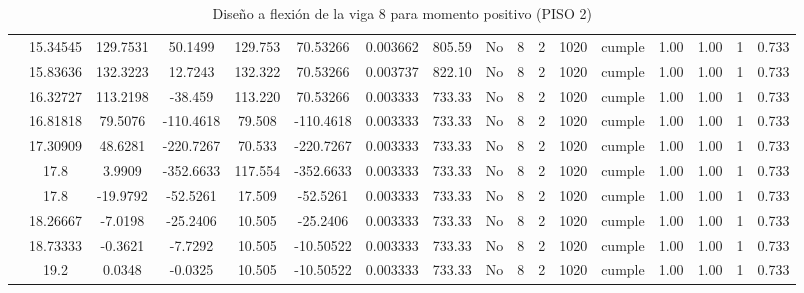 \begin{table}[H]
{\begin{tabular}{|c|c|c|c|c|c|c|c|c|c|c|c|c|c|c|c|c|}
\cline{2-17}        & 15.34545 & 129.7531 & 50.1499 & 129.753 & 70.53266 & 0.003662 & 805.59 & No  & 8   & 2   & 1020 & \cellcolor[rgb]{ .776,  .937,  .808}cumple & 1.00 & 1.00 & 1   & 0.733 \bigstrut\\
\cline{2-17}        & 15.83636 & 132.3223 & 12.7243 & 132.322 & 70.53266 & 0.003737 & 822.10 & No  & 8   & 2   & 1020 & \cellcolor[rgb]{ .776,  .937,  .808}cumple & 1.00 & 1.00 & 1   & 0.733 \bigstrut\\
\cline{2-17}        & 16.32727 & 113.2198 & -38.459 & 113.220 & 70.53266 & 0.003333 & 733.33 & No  & 8   & 2   & 1020 & \cellcolor[rgb]{ .776,  .937,  .808}cumple & 1.00 & 1.00 & 1   & 0.733 \bigstrut\\
\cline{2-17}        & 16.81818 & 79.5076 & -110.4618 & 79.508 & -110.4618 & 0.003333 & 733.33 & No  & 8   & 2   & 1020 & \cellcolor[rgb]{ .776,  .937,  .808}cumple & 1.00 & 1.00 & 1   & 0.733 \bigstrut\\
\cline{2-17}        & 17.30909 & 48.6281 & -220.7267 & 70.533 & -220.7267 & 0.003333 & 733.33 & No  & 8   & 2   & 1020 & \cellcolor[rgb]{ .776,  .937,  .808}cumple & 1.00 & 1.00 & 1   & 0.733 \bigstrut\\
\cline{2-17}        & \cellcolor[rgb]{ .851,  .882,  .949}17.8 & 3.9909 & -352.6633 & 117.554 & -352.6633 & 0.003333 & 733.33 & No  & 8   & 2   & 1020 & \cellcolor[rgb]{ .776,  .937,  .808}cumple & 1.00 & 1.00 & 1   & 0.733 \bigstrut\\
\cline{2-17}        & \cellcolor[rgb]{ .851,  .882,  .949}17.8 & -19.9792 & -52.5261 & 17.509 & -52.5261 & 0.003333 & 733.33 & No  & 8   & 2   & 1020 & \cellcolor[rgb]{ .776,  .937,  .808}cumple & 1.00 & 1.00 & 1   & 0.733 \bigstrut\\
\cline{2-17}        & 18.26667 & -7.0198 & -25.2406 & 10.505 & -25.2406 & 0.003333 & 733.33 & No  & 8   & 2   & 1020 & \cellcolor[rgb]{ .776,  .937,  .808}cumple & 1.00 & 1.00 & 1   & 0.733 \bigstrut\\
\cline{2-17}        & 18.73333 & -0.3621 & -7.7292 & 10.505 & -10.50522 & 0.003333 & 733.33 & No  & 8   & 2   & 1020 & \cellcolor[rgb]{ .776,  .937,  .808}cumple & 1.00 & 1.00 & 1   & 0.733 \bigstrut\\
\cline{2-17}        & 19.2 & 0.0348 & -0.0325 & 10.505 & -10.50522 & 0.003333 & 733.33 & No  & 8   & 2   & 1020 & \cellcolor[rgb]{ .776,  .937,  .808}cumple & 1.00 & 1.00 & 1   & 0.733 \bigstrut\\
    \hline
    \end{tabular}%
  

  
}%
    \caption{Diseño a flexión de la viga 8 para momento positivo (PISO 2)}
  \label{tab:F VG8 P2 M+}%
\end{table}%
